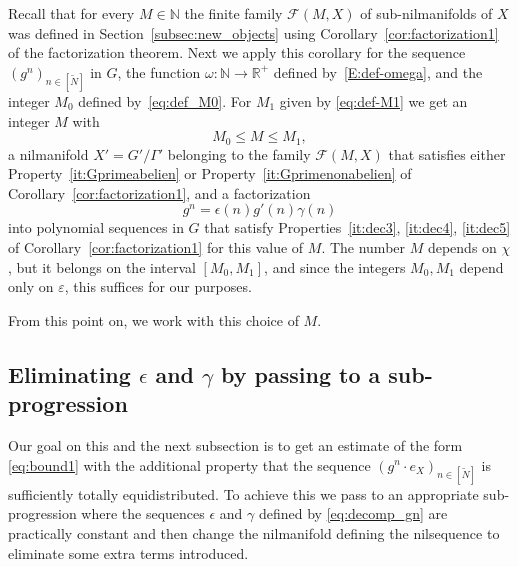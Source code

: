 \documentclass[11pt]{amsart}
\theoremstyle{definition}
\begin{document}
Recall that for every $M\in{{\mathbb N}}$ the finite family ${{\mathcal F}}(M,X)$ of
sub-nilmanifolds of $X$ was defined   in
Section~\ref{subsec:new_objects}  using
Corollary~\ref{cor:factorization1} of the factorization theorem.
Next we apply this corollary  for the  sequence
$(g^n)_{n\in [{{\widetilde N}}]}$ in $G$, the function $\omega\colon{{\mathbb N}}\to{{\mathbb R}}^+$
defined by~\eqref{E:def-omega}, and
 the integer  $M_0$ defined by~\eqref{eq:def_M0}.
For $M_1$ given by \eqref{eq:def-M1} we get   an integer   $M$ with
\begin{equation}\label{E:def-M_1}
   M_0\leq M\leq M_1,
\end{equation}
a nilmanifold $X'=G'/\Gamma'$  belonging to the family ${{\mathcal F}}(M,X)$
that satisfies either Property~\eqref{it:Gprimeabelien} or Property~\eqref{it:Gprimenonabelien} of Corollary~\ref{cor:factorization1},
and a factorization
\begin{equation}
\label{eq:decomp_gn}
g^n=\epsilon(n)g'(n)\gamma(n)
\end{equation}
into polynomial sequences in $G$ that satisfy
Properties~\eqref{it:dec3}, \eqref{it:dec4}, \eqref{it:dec5} of
Corollary~\ref{cor:factorization1} for  this value of $M$. The
number  $M$  depends on $\chi$, but it belongs on the interval
$[M_0,M_1]$, and since the integers $M_0, M_1$ depend only on ${\varepsilon}$,
this suffices for our purposes.

From this point on, we work with this choice of $M$.

\subsection{Eliminating $\epsilon$ and $\gamma$ by passing to a
sub-progression}\label{SS:subprogression} Our goal on this and the
next subsection is to get an estimate of the form \eqref{eq:bound1}
with the additional property that the
 sequence $(g^n\cdot e_X)_{n\in [{{\widetilde N}}]}$ is sufficiently totally
equidistributed. To achieve this we  pass to an appropriate
sub-progression where the sequences $\epsilon$ and $\gamma$ defined
by \eqref{eq:decomp_gn} are practically constant and then change
the nilmanifold defining the nilsequence to eliminate some extra
terms introduced.
\end{document}
